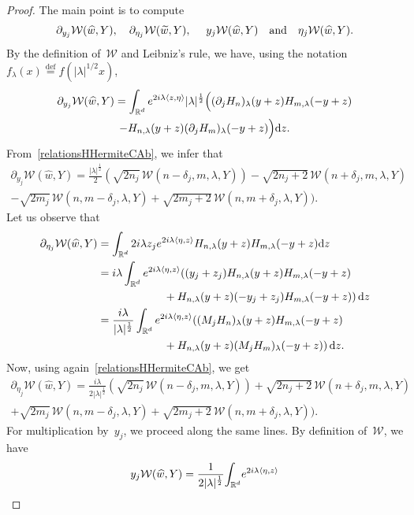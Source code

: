 \documentclass[AHL,Unicode,longabstracts]{cedram}
\let\wt=\widetilde
\let\wh=\widehat
\def\R{{\mathop{\mathbb R\kern 0pt}\nolimits}}
\newcommand{\lam}{\lambda}
\newcommand{\wt}{\widetilde}
\newcommand{\wh}{\widehat}
\newcommand*\cW{\mathcal{W}}
\newcommand*\R{\mathbb{R}}
\newcommand{\andf}{\quad\hbox{and}\quad}
\newcommand*\eqdefa{\overset{\mathrm{def}}{=}}
\newcommand*{\dd}{\mathrm{d}}
\newcommand{\dz}{\dd z}
\begin{document}
\begin{proof}
The main point is to compute
\[
\partial_{y_j} \cW(\wh w,Y),\quad\partial_{\eta_j} \cW(\wt w,Y),\quad\ y_j \cW(\wh w,Y)\andf \eta_j \cW(\wh w,Y).
\]
By the definition of~$\cW$ and Leibniz's rule, we have, using the notation $f_\lam(x)\eqdefa f(|\lam|^{1/2}x)$,
\begin{multline*}
\partial_{y_j} \cW(\wh w,Y) = \int_{\R^d} e^{2i\lam\langle z,\eta\rangle } |\lam|^{\frac 12}
\Big((\partial_jH_n)_{\lam} (y+z) H_{m,\lam} (-y+z) \\ -H_{n,\lam} (y+z) (\partial_jH_m)_\lam (-y+z) \Big)\dz.
\end{multline*}
From~\eqref{relationsHHermiteCAb}, we infer that
\begin{multline}\label{actionX_jonFHdemoeq1}
\!\!\partial_{y_j} \cW(\wh w,Y) = \frac {|\lam|^{\frac 12}} 2 (\sqrt {2n_j}\, \cW(n\!-\!\delta_j,m,\lam,Y)) -\sqrt {2n_j\!+\!2}\, \cW(n\!+\!\delta_j,m,\lam,Y) \\
-\sqrt {2m_j}\,\cW(n,m-\delta_j,\lam,Y) +\sqrt {2m_j+2}\,\cW(n,m+\delta_j,\lam,Y)).\!\!
\end{multline}
Let us observe that
\[
\begin{aligned}
\partial_{\eta_j} \cW(\wh w,Y) & = \int_{\R^d} 2i\lam z_j e^{2i\lam\langle \eta,z\rangle} H_{n,\lam}(y+z)H_{m,\lam} (-y+z) \dz\\
& = i\lam \int_{\R^d} e^{2i\lam\langle \eta,z\rangle}((y_j+z_j) H_{n,\lam}(y+z)H_{m,\lam} (-y+z) \\
& \qquad\qquad\qquad + H_{n,\lam}(y+z)(-y_j+z_j)H_{m,\lam} (-y+z))\,\dz\\
&= \frac {i\lam} {|\lam|^{\frac 12} }\int_{\R^d}e^{2i\lam\langle \eta,z\rangle} ((M_jH_{n})_\lam(y+z)H_{m,\lam} (-y+z) \\
& \qquad\qquad\qquad +H_{n,\lam}(y+z) (M_jH_m)_\lam(-y+z))\,\dz.
\end{aligned}
\]
Now, using again~\eqref{relationsHHermiteCAb}, we get
\begin{multline}\label{actionX_jonFHdemoeq2}
\partial_{\eta_j} \cW(\wh w,Y) \!= \frac {i\lam} {2|\lam|^{\frac 12} }(\sqrt {2n_j}\, \cW(n\!-\!\delta_j,m,\lam,Y) )
\!+\!\sqrt {2n_j\!+\!2}\, \cW(n\!+\!\delta_j,m,\lam,Y) \\
+\sqrt {2m_j}\,\cW(n,m-\delta_j,\lam,Y) +\sqrt {2m_j+2}\,\cW(n,m+\delta_j,\lam,Y)).
\end{multline}
For multiplication by~$y_j$, we proceed along the same lines. By definition of~$\cW$, we have
\begin{multline*}
y_j\cW(\wh w,Y) =\frac 1 {2|\lam|^{\frac12}}\! \int_{\R^d}\! e^{2i\lam\langle \eta,z\rangle}

\end{multline*}
\end{proof}
\end{document}
